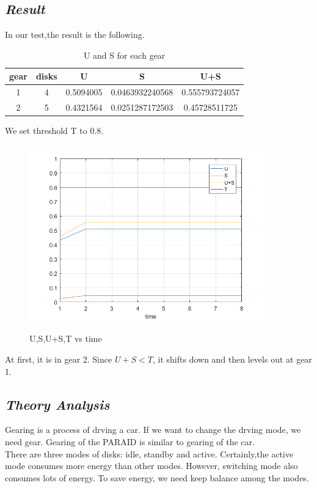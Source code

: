 \documentclass[conference]{IEEEtran}
\begin{document}
\subsection{\emph{\textbf{Result}}}
In our test,the result is the following.\\
\begin{table}[H]
\centering
\begin{tabular}{ccccc}
\hline
gear		&disks		&U			&S 					&U+S			\\ \hline
1			&4			&0.5094005	&0.0463932240568 	&0.555793724057	\\ \hline
2			&5			&0.4321564	&0.0251287172503	&0.45728511725	\\ \hline
\end{tabular}
\caption{U and S for each gear}
\end{table}
We set threshold T to 0.8.
\begin{figure}[H]
  \centering
  \includegraphics[width=4in]{utilization.png}\\
  \caption{U,S,U+S,T vs time}\label{figure2}
\end{figure}
At first, it is in gear 2. Since $U+S<T$, it shifts down and then levels out at gear 1.
\subsection{\emph{\textbf{Theory Analysis}}}
Gearing is a process of drving a car. If we want to change the drving mode, we need gear. Gearing of the PARAID is similar to gearing of the car.\\

There are three modes of disks: idle, standby and active. Certainly,the active mode consumes more energy than other modes. However, switching mode also consumes lots of energy. To save energy, we need keep balance among the modes.\\
\end{document}
